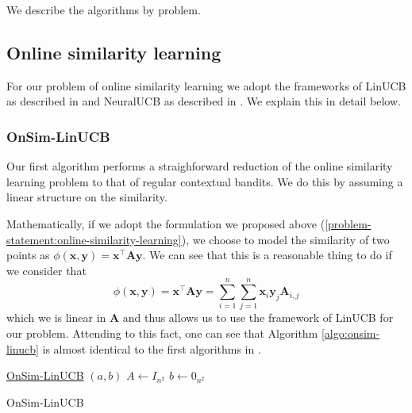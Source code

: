 \documentclass{article}
\begin{document}
We describe the algorithms by problem.

\subsection{Online similarity learning}
For our problem of online similarity learning we adopt the frameworks of  LinUCB  as described in \cite{linucb} and  NeuralUCB as described in \cite{neuralucb}. We explain this in detail below.

\subsubsection{OnSim-LinUCB}
Our first algorithm performs a straighforward reduction of the online similarity learning problem to that of regular contextual bandits. We do this by assuming a linear structure on the similarity.

Mathematically, if we adopt the formulation we proposed above (\ref{problem-statement:online-similarity-learning}), we choose to model the similarity of two points as  $\phi(\mathbf{x}, \mathbf{y}) = \mathbf{x}^\top \mathbf{A} \mathbf{y}$.
We can see that this is a reasonable thing to do if we consider that
\[\phi(\mathbf{x}, \mathbf{y}) = \mathbf{x}^\top \mathbf{A} \mathbf{y} = \sum_{i =1}^n\sum_{j=1}^n \mathbf{x}_i \mathbf{y}_j \mathbf{A}_{i,j} \]
which we is linear in $\mathbf{A}$ and thus allows us to use the framework of LinUCB for our problem.
Attending to this fact, one can see that Algorithm \ref{algo:onsim-linucb} is almost identical to the first algorithms in \cite{linucb}.
\begin{algorithm}
  \label{algo:onsim-linucb}
    \underline{OnSim-LinUCB} $(a,b)$\;
    $A \gets I_{n^2}$\;
    $b \gets 0_{n^2}$\;
    \caption{OnSim-LinUCB}
\end{algorithm}
\end{document}
